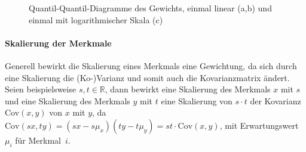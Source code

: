  \begin{figure}
  \qquad
  \qquad
  
  \caption{ Quantil-Quantil-Diagramme des Gewichts, einmal linear (a,b) und einmal mit logarithmischer Skala (c)}
  \label{qqdiagrams_weight}
 \end{figure}
 
 
 \paragraph{Skalierung der Merkmale}
 Generell bewirkt die Skalierung eines Merkmals eine Gewichtung, da sich durch eine Skalierung die (Ko-)Varianz und somit auch die Kovarianzmatrix ändert. Seien beispielsweise $s,t \in \mathbb{R}$, dann bewirkt eine Skalierung des Merkmals $x$ mit $s$ und eine Skalierung des Merkmals $y$ mit $t$ eine Skalierung von $s \cdot t$ der Kovarianz Cov$(x,y)$ von $x$ mit $y$, da $\mathrm{Cov}(sx, ty) = (sx - s\mu_x) (ty - t\mu_y) = st \cdot \mathrm{Cov}(x,y)$, mit Erwartungswert $\mu_i$ für \mbox{Merkmal $i$}.
 
